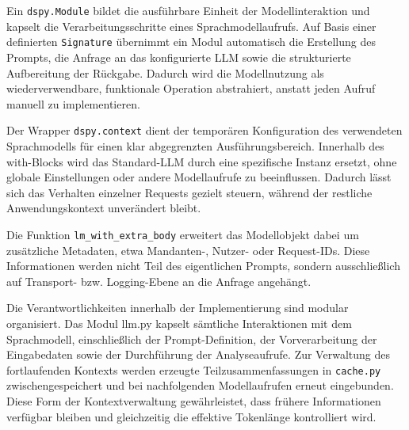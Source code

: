 Ein \texttt{dspy.Module} bildet die ausführbare Einheit der Modellinteraktion und kapselt die Verarbeitungsschritte eines Sprachmodellaufrufs. Auf Basis einer definierten \texttt{Signature} übernimmt ein Modul automatisch die Erstellung des Prompts, die Anfrage an das konfigurierte LLM sowie die strukturierte Aufbereitung der Rückgabe. Dadurch wird die Modellnutzung als wiederverwendbare, funktionale Operation abstrahiert, anstatt jeden Aufruf manuell zu implementieren. 

Der Wrapper \texttt{dspy.context} dient der temporären Konfiguration des verwendeten Sprachmodells für einen klar abgegrenzten Ausführungsbereich. Innerhalb des with-Blocks wird das Standard-LLM durch eine spezifische Instanz ersetzt, ohne globale Einstellungen oder andere Modellaufrufe zu beeinflussen. Dadurch lässt sich das Verhalten einzelner Requests gezielt steuern, während der restliche Anwendungskontext unverändert bleibt.

Die Funktion \texttt{lm\_with\_extra\_body} erweitert das Modellobjekt dabei um zusätzliche Metadaten, etwa Mandanten-, Nutzer- oder Request-IDs. Diese Informationen werden nicht Teil des eigentlichen Prompts, sondern ausschließlich auf Transport- bzw. Logging-Ebene an die Anfrage angehängt.

Die Verantwortlichkeiten innerhalb der Implementierung sind modular organisiert. Das Modul llm.py kapselt sämtliche Interaktionen mit dem Sprachmodell, einschließlich der Prompt-Definition, der Vorverarbeitung der Eingabedaten sowie der Durchführung der Analyseaufrufe. Zur Verwaltung des fortlaufenden Kontexts werden erzeugte Teilzusammenfassungen in \texttt{cache.py} zwischengespeichert und bei nachfolgenden Modellaufrufen erneut eingebunden. Diese Form der Kontextverwaltung gewährleistet, dass frühere Informationen verfügbar bleiben und gleichzeitig die effektive Tokenlänge kontrolliert wird.


